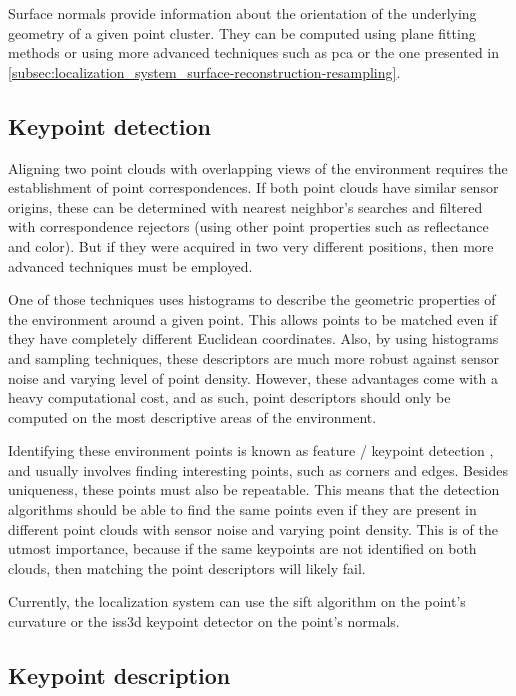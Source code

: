 Surface normals provide information about the orientation of the underlying geometry of a given point cluster. They can be computed using plane fitting methods or using more advanced techniques such as \gls{pca} \cite{Jolliffe2002} or the one presented in \cref{subsec:localization_system_surface-reconstruction-resampling}.


\subsection{Keypoint detection}

Aligning two point clouds with overlapping views of the environment requires the establishment of point correspondences. If both point clouds have similar sensor origins, these can be determined with nearest neighbor's searches and filtered with correspondence rejectors (using other point properties such as reflectance and color). But if they were acquired in two very different positions, then more advanced techniques must be employed.

One of those techniques uses histograms to describe the geometric properties of the environment around a given point. This allows points to be matched even if they have completely different Euclidean coordinates. Also, by using histograms and sampling techniques, these descriptors are much more robust against sensor noise and varying level of point density. However, these advantages come with a heavy computational cost, and as such, point descriptors should only be computed on the most descriptive areas of the environment.

Identifying these environment points is known as feature / keypoint detection \cite{Filipe2014}, and usually involves finding interesting points, such as corners and edges. Besides uniqueness, these points must also be repeatable. This means that the detection algorithms should be able to find the same points even if they are present in different point clouds with sensor noise and varying point density. This is of the utmost importance, because if the same keypoints are not identified on both clouds, then matching the point descriptors will likely fail.

Currently, the localization system can use the \gls{sift} \cite{Lowe2004} algorithm on the point's curvature or the \gls{iss3d} \cite{Zhong2009} keypoint detector on the point's normals.


\subsection{Keypoint description}


